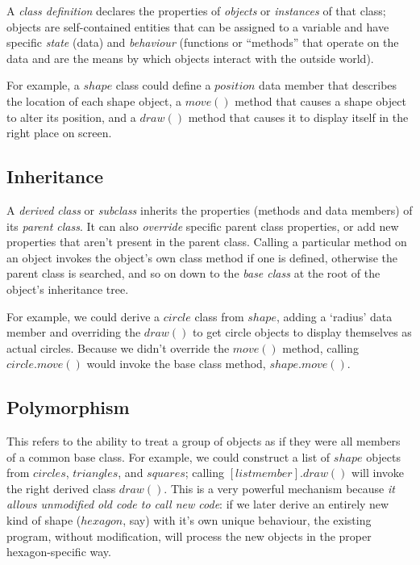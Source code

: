 \documentclass[11pt,a4paper]{article}
\begin{document}
A {\em class definition} declares the properties of {\em objects} or
{\em instances} of that class; objects are self-contained entities that
can be assigned to a variable and have specific {\em state} (data) and
{\em behaviour} (functions or ``methods'' that operate on the data and
are the means by which objects interact with the outside world).    

For example, a $shape$ class could define a $position$ data member that
describes the location of each shape object, a $move()$ method that
causes a shape object to alter its position, and a $draw()$ method that
causes it to display itself in the right place on screen.

\subsection{Inheritance}

A {\em derived class} or {\em subclass} inherits the properties (methods
and data members) of its {\em parent class}. It can also {\em override}
specific parent class properties, or add new properties that aren't
present in the parent class. Calling a particular method on an object
invokes the object's own class method if one is defined, otherwise the
parent class is searched, and so on down to the {\em base class} at the
root of the object's inheritance tree. 

For example, we could derive a $circle$ class from $shape$, adding a
`radius' data member and overriding the $draw()$ to get circle objects
to display themselves as actual circles.  Because we didn't override the
$move()$ method, calling $circle.move()$ would invoke the base class
method, $shape.move()$. 


\subsection{Polymorphism}

This refers to the ability to treat a group of objects as if they were
all members of a common base class.  For example, we could construct a
list of $shape$ objects from $circles$, $triangles$, and $squares$;
calling $[list member].draw()$ will invoke the right derived class
$draw()$. This is a very powerful mechanism because {\em it allows
unmodified old code to call new code}: if we later derive an entirely
new kind of shape ($hexagon$, say) with it's own unique behaviour, the
existing program, without modification, will process the new objects in
the proper hexagon-specific way.
\end{document}
